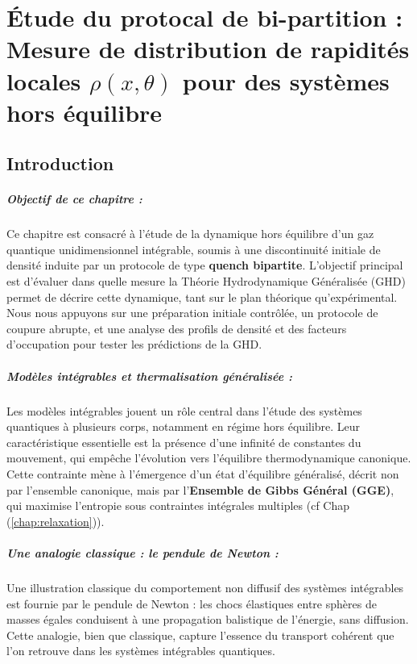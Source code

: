 \chapter{Étude du protocal de bi-partition : Mesure de distribution de rapidités locales $\rho(x , \theta ) $  pour des systèmes hors équilibre}
\minitoc


\section*{Introduction}


\paragraph{Objectif de ce chapitre :}
Ce chapitre est consacré à l’étude de la dynamique hors équilibre d’un gaz quantique unidimensionnel intégrable, soumis à une discontinuité initiale de densité induite par un protocole de type {\bf quench bipartite}. L’objectif principal est d’évaluer dans quelle mesure la Théorie Hydrodynamique Généralisée (GHD) permet de décrire cette dynamique, tant sur le plan théorique qu’expérimental. Nous nous appuyons sur une préparation initiale contrôlée, un protocole de coupure abrupte, et une analyse des profils de densité et des facteurs d’occupation pour tester les prédictions de la GHD.

\paragraph{Modèles intégrables et thermalisation généralisée :}
Les modèles intégrables jouent un rôle central dans l’étude des systèmes quantiques à plusieurs corps, notamment en régime hors équilibre. Leur caractéristique essentielle est la présence d’une infinité de constantes du mouvement, qui empêche l’évolution vers l’équilibre thermodynamique canonique. Cette contrainte mène à l’émergence d’un état d’équilibre généralisé, décrit non par l’ensemble canonique, mais par l’{\bf Ensemble de Gibbs Général (GGE)}, qui maximise l’entropie sous contraintes intégrales multiples (cf Chap (\ref{chap:relaxation})).

\paragraph{Une analogie classique : le pendule de Newton :}
Une illustration classique du comportement non diffusif des systèmes intégrables est fournie par le pendule de Newton : les chocs élastiques entre sphères de masses égales conduisent à une propagation balistique de l’énergie, sans diffusion. Cette analogie, bien que classique, capture l’essence du transport cohérent que l’on retrouve dans les systèmes intégrables quantiques.

